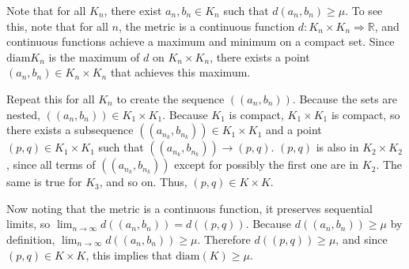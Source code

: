 \documentclass{article}
\newcommand{\diam}{\text{diam}}
\newcommand{\R}{\mathbb{R}}
\begin{document}
Note that for all $K_n$, there exist $a_n, b_n \in K_n$ such that $d(a_n, b_n) \geq \mu$. To see this, note that for all $n$, the metric is a continuous function $d: K_n \times K_n \Rightarrow \R$, and continuous functions achieve a maximum and minimum on a compact set. Since $\diam K_n$ is the maximum of $d$ on $K_n \times K_n$, there exists a point $(a_n, b_n) \in K_n \times K_n$ that achieves this maximum.

Repeat this for all $K_n$ to create the sequence $((a_n, b_n))$. Because the sets are nested, $((a_n, b_n)) \in K_1 \times K_1$. Because $K_1$ is compact, $K_1 \times K_1$ is compact, so there exists a subsequence $((a_{n_k}, b_{n_k})) \in K_1 \times K_1$ and a point $(p, q) \in K_1 \times K_1$ such that $((a_{n_k}, b_{n_k})) \rightarrow (p, q)$. $(p, q)$ is also in $K_2 \times K_2$, since all terms of $((a_{n_k}, b_{n_k}))$ except for possibly the first one are in $K_2$. The same is true for $K_3$, and so on. Thus, $(p, q) \in K \times K$.

Now noting that the metric is a continuous function, it preserves sequential limits, so $\lim_{n \rightarrow \infty} d((a_n, b_n)) = d((p, q))$. Because $d((a_n, b_n)) \geq \mu$ by definition, $\lim_{n \rightarrow \infty} d((a_n, b_n)) \geq \mu$. Therefore $d((p, q)) \geq \mu$, and since $(p, q) \in K \times K$, this implies that $\diam(K) \geq \mu$.
\end{document}
